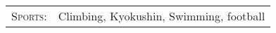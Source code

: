 
\begin{tabular}{rl}
    \textsc{Sports:} & Climbing, Kyokushin,  Swimming, football \\
\end{tabular}
\\
